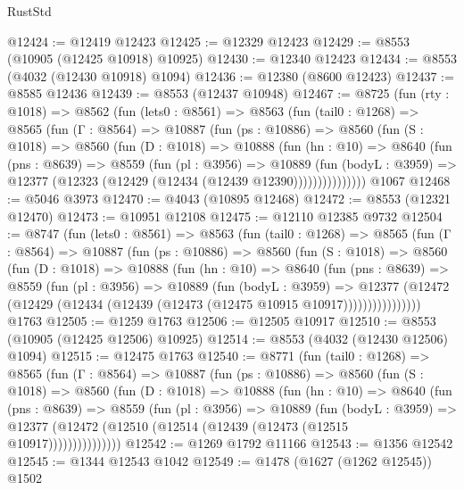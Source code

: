 \begin{lexlean}{RustStd}
\begin{coremodule}
@12424 := @12419 @12423
@12425 := @12329 @12423
@12429 := @8553 (@10905 (@12425 @10918) @10925)
@12430 := @12340 @12423
@12434 := @8553 (@4032 (@12430 @10918) @1094)
@12436 := @12380 (@8600 @12423)
@12437 := @8585 @12436
@12439 := @8553 (@12437 @10948)
@12467 := @8725
    (fun (rty : @1018) =>
    @8562
      (fun (lets0 : @8561) =>
      @8563
        (fun (tail0 : @1268) =>
        @8565
          (fun (Γ : @8564) =>
          @10887
            (fun (ps : @10886) =>
            @8560
              (fun (S : @1018) =>
              @8560
                (fun (D : @1018) =>
                @10888
                  (fun (hn : @10) =>
                  @8640
                    (fun (pns : @8639) =>
                    @8559
                      (fun (pl : @3956) =>
                      @10889
                        (fun (bodyL : @3959) =>
                        @12377 (@12323 (@12429 (@12434 (@12439 @12390)))))))))))))))
    @1067
@12468 := @5046 @3973
@12470 := @4043 (@10895 @12468)
@12472 := @8553 (@12321 @12470)
@12473 := @10951 @12108
@12475 := @12110 @12385 @9732
@12504 := @8747
    (fun (lets0 : @8561) =>
    @8563
      (fun (tail0 : @1268) =>
      @8565
        (fun (Γ : @8564) =>
        @10887
          (fun (ps : @10886) =>
          @8560
            (fun (S : @1018) =>
            @8560
              (fun (D : @1018) =>
              @10888
                (fun (hn : @10) =>
                @8640
                  (fun (pns : @8639) =>
                  @8559
                    (fun (pl : @3956) =>
                    @10889
                      (fun (bodyL : @3959) =>
                      @12377
                        (@12472
                          (@12429 (@12434 (@12439 (@12473 (@12475 @10915 @10917))))))))))))))))
    @1763
@12505 := @1259 @1763
@12506 := @12505 @10917
@12510 := @8553 (@10905 (@12425 @12506) @10925)
@12514 := @8553 (@4032 (@12430 @12506) @1094)
@12515 := @12475 @1763
@12540 := @8771
    (fun (tail0 : @1268) =>
    @8565
      (fun (Γ : @8564) =>
      @10887
        (fun (ps : @10886) =>
        @8560
          (fun (S : @1018) =>
          @8560
            (fun (D : @1018) =>
            @10888
              (fun (hn : @10) =>
              @8640
                (fun (pns : @8639) =>
                @8559
                  (fun (pl : @3956) =>
                  @10889
                    (fun (bodyL : @3959) =>
                    @12377 (@12472 (@12510 (@12514 (@12439 (@12473 (@12515 @10917)))))))))))))))
@12542 := @1269 @1792 @11166
@12543 := @1356 @12542
@12545 := @1344 @12543 @1042
@12549 := @1478 (@1627 (@1262 @12545)) @1502

\end{coremodule}
\end{lexlean}
